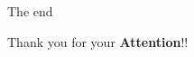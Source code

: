\documentclass{beamer}
\newcommand{\eptfootnote}[1]{{%
  \let\thempfn\relax%
  \footnotetext[0]{\emph{#1}}%
}}
\begin{document}
\begin{frame}{The end}
\begin{center}
{\Large Thank you for your \textbf{Attention}!!}
\end{center}
\end{frame}


%
\end{document}
